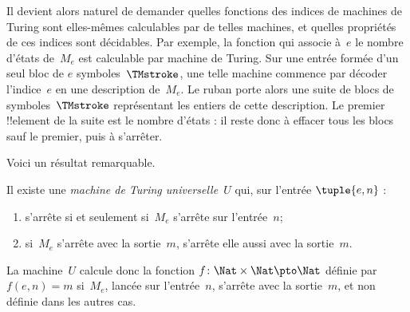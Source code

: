\documentclass[../../../include/open-logic-section]{subfiles}
\begin{document}
Il devient alors naturel de demander quelles fonctions des indices
de machines de Turing sont elles-mêmes calculables par de telles
machines, et quelles propriétés de ces indices sont décidables.
Par exemple, la fonction qui associe à~$e$ le nombre d'états de~$M_e$
est calculable par machine de Turing. Sur une entrée formée d'un
seul bloc de $e$ symboles~$\TMstroke$, une telle machine commence
par décoder l'indice~$e$ en une description de~$M_e$. Le ruban
porte alors une suite de blocs de symboles~$\TMstroke$ représentant
les entiers de cette description. Le premier !!{element} de la
suite est le nombre d'états : il reste donc à effacer tous les
blocs sauf le premier, puis à s'arrêter.

Voici un résultat remarquable.

\begin{thm}
Il existe une \emph{machine de Turing universelle}~$U$ qui,
sur l'entrée $\tuple{e,n}$ :
\begin{enumerate}
\item s'arrête si et seulement si~$M_e$ s'arrête sur l'entrée~$n$;
\item si~$M_e$ s'arrête avec la sortie~$m$, s'arrête elle aussi
  avec la sortie~$m$.
\end{enumerate}
La machine~$U$ calcule donc la fonction
$f\colon \Nat \times \Nat \pto \Nat$ définie par $f(e,n)=m$
si~$M_e$, lancée sur l'entrée~$n$, s'arrête avec la sortie~$m$,
et non définie dans les autres cas.
\end{thm}
\end{document}
